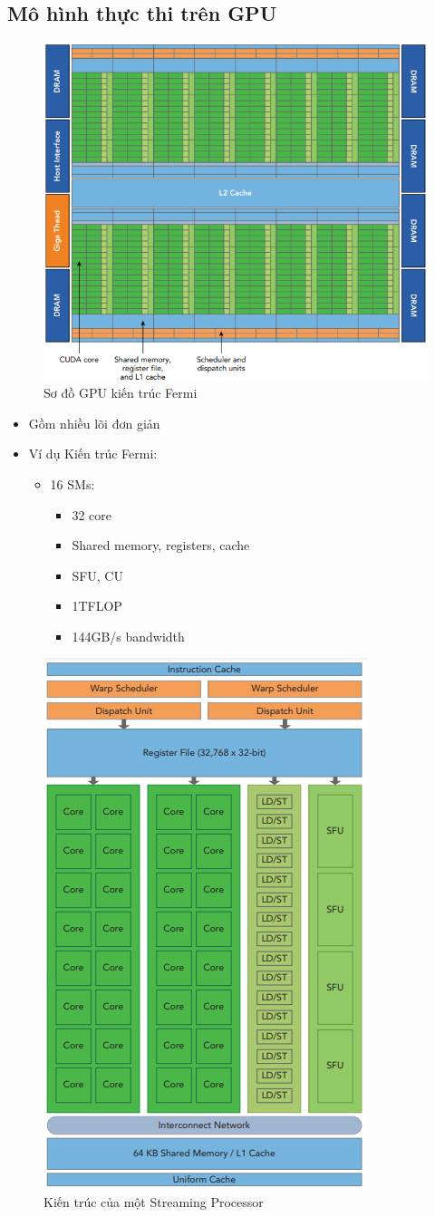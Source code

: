 \documentclass[14pt, a4paper]{article}
\numberwithin{equation}{section}
\numberwithin{figure}{section}
\numberwithin{dl}{section}
\numberwithin{md}{section}
\numberwithin{bd}{section}
\numberwithin{dn}{section}
\numberwithin{hq}{section}
\begin{document}
\subsection{Mô hình thực thi trên GPU}

\begin{figure}[H]
    \centering
    \includegraphics[width=0.5\linewidth]{figures/CUDA/Fermi_Architecture.png}
    \caption{Sơ đồ GPU kiến trúc Fermi}
\end{figure}

\begin{itemize}
    \item Gồm nhiều lõi đơn giản
    \item Ví dụ Kiến trúc Fermi:
    \begin{itemize}
        \item 16 SMs:
        \begin{itemize}
            \item 32 core 
            \item Shared memory, registers, cache 
            \item SFU, CU
            \item 1TFLOP 
            \item 144GB/s bandwidth
        \end{itemize}
    \end{itemize}
\end{itemize}
\begin{figure}[H]
    \centering
    \includegraphics[width=0.5\linewidth]{figures/CUDA/SMs_diagram.png}
    \caption{Kiến trúc của một Streaming Processor}
\end{figure}
\end{document}
